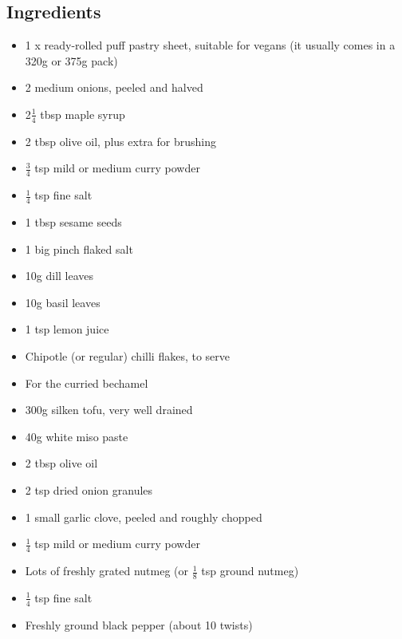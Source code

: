 \documentclass{book}
\begin{document}
\subsection*{Ingredients}
\begin{itemize}
\item 1 x ready-rolled puff pastry sheet, suitable for vegans (it usually comes in a 320g or 375g pack)
\item 2 medium onions, peeled and halved
\item 2$\frac{1}{4}$ tbsp maple syrup 
\item 2 tbsp olive oil, plus extra for brushing
\item $\frac{3}{4}$ tsp mild or medium curry powder
\item $\frac{1}{4}$ tsp fine salt
\item 1 tbsp sesame seeds
\item 1 big pinch flaked salt
\item 10g dill leaves
\item 10g basil leaves
\item 1 tsp lemon juice
\item Chipotle (or regular) chilli flakes, to serve
\end{itemize}

\begin{itemize}
\item For the curried bechamel
\item 300g silken tofu, very well drained
\item 40g white miso paste
\item 2 tbsp olive oil
\item 2 tsp dried onion granules
\item 1 small garlic clove, peeled and roughly chopped
\item $\frac{1}{4}$ tsp mild or medium curry powder
\item Lots of freshly grated nutmeg (or $\frac{1}{8}$ tsp ground nutmeg)
\item $\frac{1}{4}$ tsp fine salt 
\item Freshly ground black pepper (about 10 twists)
\end{itemize}
\end{document}
